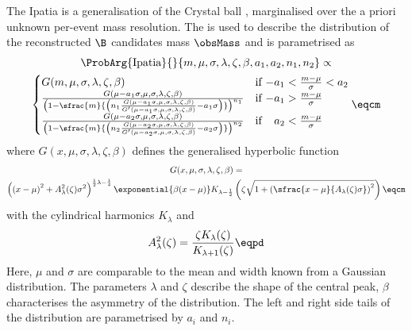 The Ipatia \PDF \cite{Santos:2013gra} is a generalisation of the Crystal ball
\PDF \cite{Oreglia:1980cs,Gaiser:1982yw,Skwarnicki:1986xj}, marginalised over
the a priori unknown per-event mass resolution. The \PDF is used to describe the
distribution of the reconstructed $\B$ candidates mass $\obsMass$ and is
parametrised as
%
\begin{multline}\label{eq:measurement_of_sin2beta:likelihood_fit:pdfs:ipatia}
  \ProbArg{\text{Ipatia}}{}{m, \mu, \sigma, \lambda, \zeta, \beta, a_1, a_2, n_1, n_2} \propto \\
    \begin{cases}
      G(m, \mu, \sigma, \lambda, \zeta, \beta)    & \text{if $-a_1 < \frac{m-\mu}{\sigma} < a_2$} \\
      \frac{G(\mu - a_1 \sigma, \mu, \sigma, \lambda, \zeta, \beta)}{
        \left( 1 - \sfrac{m}{\left( n_1 \frac{G(\mu - a_1 \sigma, \mu, \sigma, \lambda, \zeta, \beta)}{G^\prime(\mu - a_1 \sigma, \mu, \sigma, \lambda, \zeta, \beta)} - a_1 \sigma \right)} \right)^{n_1}
      }     & \text{if $-a_1 > \frac{m-\mu}{\sigma}$} \\
      \frac{G(\mu - a_2 \sigma, \mu, \sigma, \lambda, \zeta, \beta)}{
        \left( 1 - \sfrac{m}{\left( n_2 \frac{G(\mu - a_2 \sigma, \mu, \sigma, \lambda, \zeta, \beta)}{G^\prime(\mu - a_2 \sigma, \mu, \sigma, \lambda, \zeta, \beta)} - a_2 \sigma \right)} \right)^{n_2}
      }     & \text{if $\phantom{-}a_2 < \frac{m-\mu}{\sigma}$} \\
  \end{cases}\eqcm
\end{multline}
%
where $G(x, \mu, \sigma, \lambda, \zeta, \beta)$ defines the generalised hyperbolic function
\begin{multline}\label{eq:measurement_of_sin2beta:likelihood_fit:pdfs:generalised_hyperbolic}
  G(x, \mu, \sigma, \lambda, \zeta, \beta) = \\
  \left(\left(x - \mu\right)^2 + A_\lambda^2(\zeta) \sigma^2 \right)^{\frac{1}{2} \lambda - \frac{1}{4}}
  \exponential{\beta (x - \mu)} K_{\lambda-\frac{1}{2}}
  \left(\zeta \sqrt{1 + \left(\sfrac{x - \mu}{A_\lambda(\zeta) \sigma}\right)^2} \right)\eqcm
\end{multline}
%
with the cylindrical harmonics $K_\lambda$ and
%
\begin{equation}
  A_\lambda^2(\zeta) = \frac{\zeta K_\lambda(\zeta)}{K_{\lambda+1}(\zeta)}\eqpd
\end{equation}
%
Here, $\mu$ and $\sigma$ are comparable to the mean and width known from a
Gaussian distribution. The parameters $\lambda$ and $\zeta$ describe the shape
of the central peak, $\beta$ characterises the asymmetry of the distribution.
The left and right side tails of the distribution are parametrised by $a_i$ and
$n_i$.

